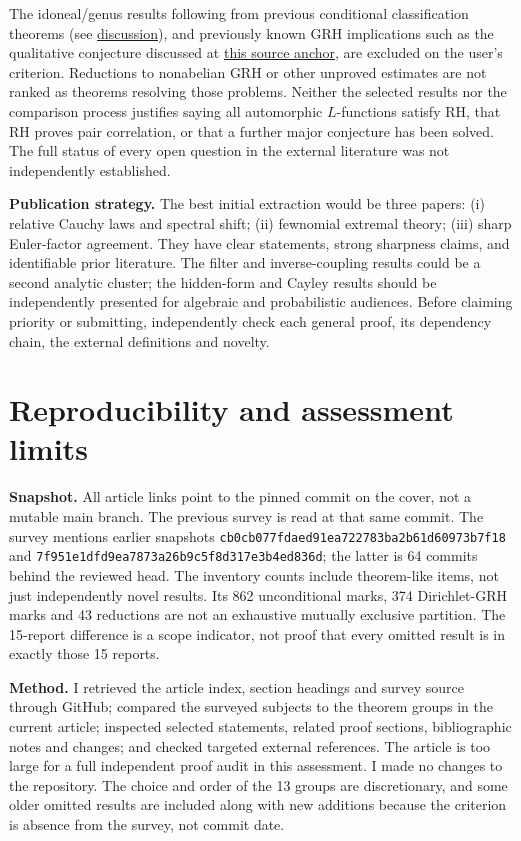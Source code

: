 \documentclass[11pt]{article}
\newcommand{\art}[3]{\href{https://github.com/VladimirReshetnikov/ProveIt/blob/3c4d27a69c98d09319a51e41a19fca05bb80a3e2/Analysis/GeneralizedRiemannHypothesis/Article/sections/#1.tex\#L#2}{#3}}
\begin{document}
The idoneal/genus results following from previous conditional classification theorems (see \art{dir}{330}{discussion}), and previously known GRH implications such as the qualitative conjecture discussed at \art{rec}{4282}{this source anchor}, are excluded on the user's criterion. Reductions to nonabelian GRH or other unproved estimates are not ranked as theorems resolving those problems. Neither the selected results nor the comparison process justifies saying all automorphic $L$-functions satisfy RH, that RH proves pair correlation, or that a further major conjecture has been solved. The full status of every open question in the external literature was not independently established.

\textbf{Publication strategy.} The best initial extraction would be three papers: (i) relative Cauchy laws and spectral shift; (ii) fewnomial extremal theory; (iii) sharp Euler-factor agreement. They have clear statements, strong sharpness claims, and identifiable prior literature. The filter and inverse-coupling results could be a second analytic cluster; the hidden-form and Cayley results should be independently presented for algebraic and probabilistic audiences. Before claiming priority or submitting, independently check each general proof, its dependency chain, the external definitions and novelty.
\clearpage
\section{Reproducibility and assessment limits}
\textbf{Snapshot.} All article links point to the pinned commit on the cover, not a mutable main branch. The previous survey is read at that same commit. The survey mentions earlier snapshots \texttt{cb0cb077fdaed91ea722783ba2b61d60973b7f18} and \texttt{7f951e1dfd9ea7873a26b9c5f8d317e3b4ed836d}; the latter is 64 commits behind the reviewed head. The inventory counts include theorem-like items, not just independently novel results. Its 862 unconditional marks, 374 Dirichlet-GRH marks and 43 reductions are not an exhaustive mutually exclusive partition. The 15-report difference is a scope indicator, not proof that every omitted result is in exactly those 15 reports.

\textbf{Method.} I retrieved the article index, section headings and survey source through GitHub; compared the surveyed subjects to the theorem groups in the current article; inspected selected statements, related proof sections, bibliographic notes and changes; and checked targeted external references. The article is too large for a full independent proof audit in this assessment. I made no changes to the repository. The choice and order of the 13 groups are discretionary, and some older omitted results are included along with new additions because the criterion is absence from the survey, not commit date.
\end{document}
